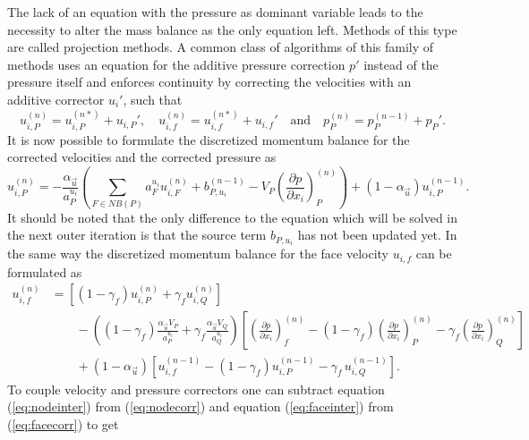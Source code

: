 The lack of an equation with the pressure as dominant variable leads to the necessity to alter the mass balance as the only equation left. Methods of this type are called projection methods. A common class of algorithms of this family of methods uses an equation for the additive pressure correction \(p'\) instead of the pressure itself and enforces continuity by correcting the velocities with an additive corrector \(u_i'\), such that
\begin{displaymath}
  u_{i,P}^{(n)} =  u_{i,P}^{(n*)}  + u_{i,P}',\quad u_{i,f}^{(n)} =  u_{i,f}^{(n*)}  + u_{i,f}' \quad \text{and} \quad   p_P^{(n)} =  p_P^{(n-1)}  + p_P'.
\end{displaymath}
It is now possible to formulate the discretized momentum balance for the corrected velocities and the corrected pressure as
\begin{equation}
  \label{eq:nodecorr}
  u_{i,P}^{(n)} 
  = 
  - \frac{\alpha_{\vec{u}}}{a_P^{u_i}} \left(\sum_{F \in NB(P)} a_F^{u_i} u_{i,F}^{(n)}
  +                                     b_{P,u_i}^{(n-1)} 
  -                                     V_P\left(\frac{\partial p}{\partial x_i}\right)_P^{(n)} \right)
  + \left(1 - \alpha_{\vec{u}}\right) u_{i,P}^{(n-1)}  .
\end{equation}
It should be noted that the only difference to the equation which will be solved in the next outer iteration is that the source term \(b_{P,u_i}\) has not been updated yet. In the same way the discretized momentum balance for the face velocity \(u_{i,f}\) can be formulated as
\begin{align}
  \label{eq:facecorr}
  u_{i,f}^{(n)} 
  &=
  \left[\left(1 - \gamma_f\right) u_{i,P}^{(n)} + \gamma_f u_{i,Q}^{(n)} \right] \nonumber\\[1em]
  &\quad\quad - 
  \left(\left(1 - \gamma_f\right) \frac{\alpha_\vec{u} V_P}{a_P^{u_i}} + \gamma_f \frac{\alpha_\vec{u} V_Q}{a_Q^{u_i}}\right)
  \left[ 
  \left(\frac{\partial p}{\partial x_i}\right)_f^{(n)} 
  -  \left(1 - \gamma_f\right) \left( \frac{\partial p}{\partial x_i} \right)_P^{(n)} 
  - \gamma_f \left(\frac{\partial p}{\partial x_i}\right)_Q^{(n)} 
  \right] \nonumber \\[1em]
  &\quad\quad + \left(1 - \alpha_\vec{u}\right) \left[ u_{i,f}^{(n-1)} - \left(1 - \gamma_f\right) u_{i,P}^{(n-1)} - \gamma_f \, u_{i,Q}^{(n-1)} \right].
\end{align}
To couple velocity and pressure correctors one can subtract equation (\ref{eq:nodeinter}) from (\ref{eq:nodecorr}) and equation (\ref{eq:faceinter}) from (\ref{eq:facecorr}) to get
